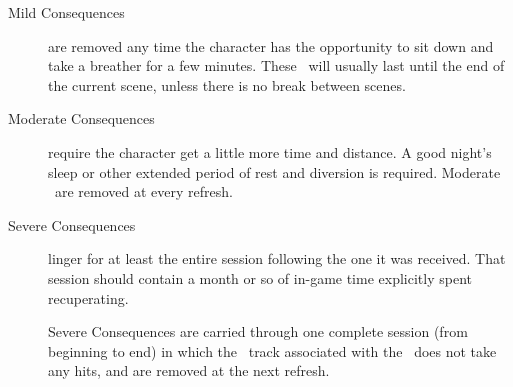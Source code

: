 \begin{description}
\item [Mild Consequences] are removed any time the character has the opportunity to sit down and take a breather for a few minutes. These \Consequences\ will usually last until the end of the current scene, unless there is no break between scenes.

\item [Moderate Consequences] require the character get a little more time and distance. A good night's sleep or other extended period of rest and diversion is required. 
Moderate \Consequences\ are removed at every refresh.

\item [Severe Consequences] linger for at least the entire session following the one it was received. That session should contain a month or so of in-game time explicitly spent recuperating.

Severe Consequences are carried through one complete session (from beginning to end) in which the \Stress\ track associated with the \Consequence\ does not take any hits, and are removed at the next refresh.
\end{description}

